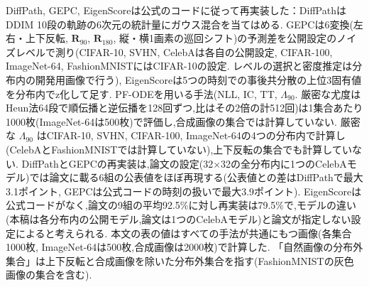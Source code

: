 \documentclass[MIRU,submit,onecolumn]{miru2025j}
\newcommand{\Rot}[1]{\mathbf{R}_{#1}}
\begin{document}
DiffPath, GEPC, EigenScoreは公式のコードに従って再実装した：DiffPathはDDIM 10段の軌跡の6次元の統計量にガウス混合を当てはめる. GEPCは6変換(左右・上下反転, $\Rot{90}$, $\Rot{180}$, 縦・横1画素の巡回シフト)の予測差を公開設定のノイズレベルで測り(CIFAR-10, SVHN, CelebAは各自の公開設定, CIFAR-100, ImageNet-64, FashionMNISTにはCIFAR-10の設定. レベルの選択と密度推定は分布内の開発用画像で行う), EigenScoreは5つの時刻での事後共分散の上位3固有値を分布内でz化して足す. %
PF-ODEを用いる手法(NLL, IC, TT, $\Lambda_{90}$. 厳密な尤度はHeun法64段で順伝播と逆伝播を128回ずつ,比はその2倍の計512回)は1集合あたり1000枚(ImageNet-64は500枚)で評価し,合成画像の集合では計算していない. 厳密な $\Lambda_{90}$ はCIFAR-10, SVHN, CIFAR-100, ImageNet-64の4つの分布内で計算し(CelebAとFashionMNISTでは計算していない),上下反転の集合でも計算していない. %
DiffPathとGEPCの再実装は,論文の設定(32$\times$32の全分布内に1つのCelebAモデル)では論文に載る6組の公表値をほぼ再現する(公表値との差はDiffPathで最大3.1ポイント, GEPCは公式コードの時刻の扱いで最大3.9ポイント). EigenScoreは公式コードがなく,論文の9組の平均92.5\%に対し再実装は79.5\%で,モデルの違い(本稿は各分布内の公開モデル,論文は1つのCelebAモデル)と論文が指定しない設定によると考えられる.%
本文の表の値はすべての手法が共通にもつ画像(各集合1000枚, ImageNet-64は500枚,合成画像は2000枚)で計算した. 「自然画像の分布外集合」は上下反転と合成画像を除いた分布外集合を指す(FashionMNISTの灰色画像の集合を含む).
\end{document}
